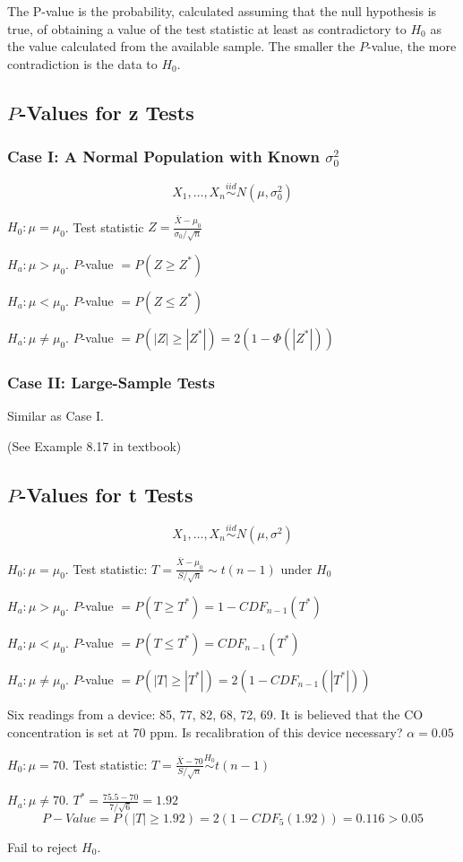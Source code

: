 \begin{defn}
The P-value is the probability, calculated assuming that the null hypothesis is true, of obtaining a value of the test statistic at least as contradictory to $H_0$ as the value calculated from the available sample. The smaller the $P$-value, the more contradiction is the data to $H_0$.
\end{defn}

\subsection{$P$-Values for z Tests}
\subsubsection{Case I: A Normal Population with Known $\sigma_0^2$}
\[X_1,\dots,X_n \overset{iid}{\sim} N(\mu,\sigma_0^2)\]

$H_0:\mu=\mu_0$. Test statistic $Z=\frac{\bar{X}-\mu_0}{\sigma_0/\sqrt{n}}$

$H_a:\mu>\mu_0$. $P$-value $= P(Z \geq Z^*)$

$H_a:\mu<\mu_0$. $P$-value $= P(Z \leq Z^*)$

$H_a:\mu\neq\mu_0$. $P$-value $= P(|Z| \geq |Z^*|)=2(1-\Phi(|Z^*|))$

\subsubsection{Case II: Large-Sample Tests}
Similar as Case I.

\begin{exmp}
(See Example 8.17 in textbook)
\end{exmp}

\subsection{$P$-Values for t Tests}
\[X_1,\dots,X_n \overset{iid}{\sim} N(\mu,\sigma^2)\]

$H_0:\mu=\mu_0$. Test statistic: $T=\frac{\bar{X}-\mu_0}{S/\sqrt{n}} \sim t(n-1) \text{ under } H_0$

$H_a:\mu>\mu_0$. $P$-value $= P(T \geq T^*)=1-CDF_{n-1}(T^*)$

$H_a:\mu<\mu_0$. $P$-value $= P(T \leq T^*)=CDF_{n-1}(T^*)$

$H_a:\mu\neq\mu_0$. $P$-value $= P(|T| \geq |T^*|)=2(1-CDF_{n-1}(|T^*|))$

\begin{exmp}
Six readings from a device: 85, 77, 82, 68, 72, 69. It is believed that the CO concentration is set at 70 ppm. Is recalibration of this device necessary? $\alpha=0.05$

$H_0:\mu=70$. Test statistic: $T=\frac{\bar{X}-70}{S/\sqrt{n}} \overset{H_0}{\sim} t(n-1) $

$H_a:\mu\neq 70$. $T^*=\frac{75.5-70}{7/\sqrt{6}}=1.92 $
\[P-Value=P(|T|\geq 1.92)=2(1-CDF_5(1.92))=0.116>0.05\]

Fail to reject $H_0$.
\end{exmp}

